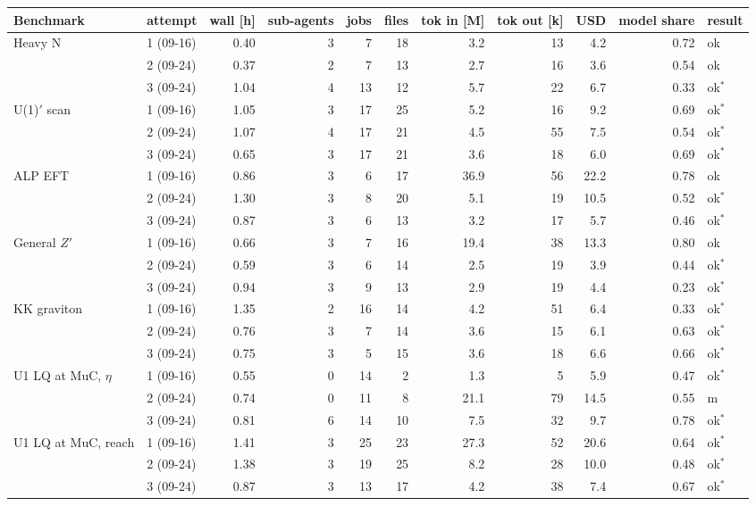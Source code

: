 \begin{tabular}{llrrrrrrrrl}
\toprule
Benchmark & attempt & wall [h] & sub-agents & jobs & files & tok in [M] & tok out [k] & USD & model share & result \\
\midrule
Heavy N & 1 (09-16) & 0.40 & 3 & 7 & 18 & 3.2 & 13 & 4.2 & 0.72 & ok \\
 & 2 (09-24) & 0.37 & 2 & 7 & 13 & 2.7 & 16 & 3.6 & 0.54 & ok \\
 & 3 (09-24) & 1.04 & 4 & 13 & 12 & 5.7 & 22 & 6.7 & 0.33 & ok$^{*}$ \\
U(1)$'$ scan & 1 (09-16) & 1.05 & 3 & 17 & 25 & 5.2 & 16 & 9.2 & 0.69 & ok$^{*}$ \\
 & 2 (09-24) & 1.07 & 4 & 17 & 21 & 4.5 & 55 & 7.5 & 0.54 & ok$^{*}$ \\
 & 3 (09-24) & 0.65 & 3 & 17 & 21 & 3.6 & 18 & 6.0 & 0.69 & ok$^{*}$ \\
ALP EFT & 1 (09-16) & 0.86 & 3 & 6 & 17 & 36.9 & 56 & 22.2 & 0.78 & ok \\
 & 2 (09-24) & 1.30 & 3 & 8 & 20 & 5.1 & 19 & 10.5 & 0.52 & ok$^{*}$ \\
 & 3 (09-24) & 0.87 & 3 & 6 & 13 & 3.2 & 17 & 5.7 & 0.46 & ok$^{*}$ \\
General $Z'$ & 1 (09-16) & 0.66 & 3 & 7 & 16 & 19.4 & 38 & 13.3 & 0.80 & ok \\
 & 2 (09-24) & 0.59 & 3 & 6 & 14 & 2.5 & 19 & 3.9 & 0.44 & ok$^{*}$ \\
 & 3 (09-24) & 0.94 & 3 & 9 & 13 & 2.9 & 19 & 4.4 & 0.23 & ok$^{*}$ \\
KK graviton & 1 (09-16) & 1.35 & 2 & 16 & 14 & 4.2 & 51 & 6.4 & 0.33 & ok$^{*}$ \\
 & 2 (09-24) & 0.76 & 3 & 7 & 14 & 3.6 & 15 & 6.1 & 0.63 & ok$^{*}$ \\
 & 3 (09-24) & 0.75 & 3 & 5 & 15 & 3.6 & 18 & 6.6 & 0.66 & ok$^{*}$ \\
U1 LQ at MuC, $\eta$ & 1 (09-16) & 0.55 & 0 & 14 & 2 & 1.3 & 5 & 5.9 & 0.47 & ok$^{*}$ \\
 & 2 (09-24) & 0.74 & 0 & 11 & 8 & 21.1 & 79 & 14.5 & 0.55 & m \\
 & 3 (09-24) & 0.81 & 6 & 14 & 10 & 7.5 & 32 & 9.7 & 0.78 & ok$^{*}$ \\
U1 LQ at MuC, reach & 1 (09-16) & 1.41 & 3 & 25 & 23 & 27.3 & 52 & 20.6 & 0.64 & ok$^{*}$ \\
 & 2 (09-24) & 1.38 & 3 & 19 & 25 & 8.2 & 28 & 10.0 & 0.48 & ok$^{*}$ \\
 & 3 (09-24) & 0.87 & 3 & 13 & 17 & 4.2 & 38 & 7.4 & 0.67 & ok$^{*}$ \\

\end{tabular}
